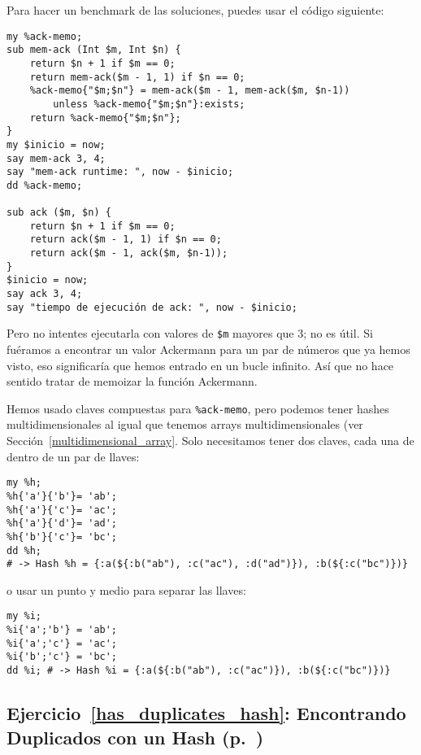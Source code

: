 Para hacer un benchmark de las soluciones, puedes usar 
el código siguiente:

\begin{verbatim}
my %ack-memo;
sub mem-ack (Int $m, Int $n) {
    return $n + 1 if $m == 0;
    return mem-ack($m - 1, 1) if $n == 0;
    %ack-memo{"$m;$n"} = mem-ack($m - 1, mem-ack($m, $n-1)) 
        unless %ack-memo{"$m;$n"}:exists;
    return %ack-memo{"$m;$n"};
}
my $inicio = now;
say mem-ack 3, 4;
say "mem-ack runtime: ", now - $inicio;
dd %ack-memo;

sub ack ($m, $n) {
    return $n + 1 if $m == 0;
    return ack($m - 1, 1) if $n == 0;
    return ack($m - 1, ack($m, $n-1));
}
$inicio = now;
say ack 3, 4;
say "tiempo de ejecución de ack: ", now - $inicio;
\end{verbatim}

Pero no intentes ejecutarla con valores de \verb|$m|
mayores que 3; no es útil. Si fuéramos a encontrar 
un valor Ackermann para un par de números que ya hemos
visto, eso significaría que hemos entrado en un bucle 
infinito. Así que no hace sentido tratar de memoizar 
la función Ackermann.

Hemos usado claves compuestas para \verb|%ack-memo|, 
pero podemos tener hashes multidimensionales al igual 
que tenemos arrays multidimensionales (ver Sección~\ref{multidimensional_array}.
Solo necesitamos tener dos claves, cada una de dentro de
un par de llaves:
\begin{verbatim}
my %h;
%h{'a'}{'b'}= 'ab';
%h{'a'}{'c'}= 'ac';
%h{'a'}{'d'}= 'ad';
%h{'b'}{'c'}= 'bc';
dd %h; 
# -> Hash %h = {:a(${:b("ab"), :c("ac"), :d("ad")}), :b(${:c("bc")})}
\end{verbatim}
%

o usar un punto y medio para separar las llaves:

\begin{verbatim}
my %i;
%i{'a';'b'} = 'ab';
%i{'a';'c'} = 'ac';
%i{'b';'c'} = 'bc';
dd %i; # -> Hash %i = {:a(${:b("ab"), :c("ac")}), :b(${:c("bc")})}
\end{verbatim}
%

\subsection{Ejercicio~\ref{has_duplicates_hash}: Encontrando Duplicados con un Hash (p.~\pageref{has_duplicates_hash})}
\label{sol_has_duplicates_hash}

